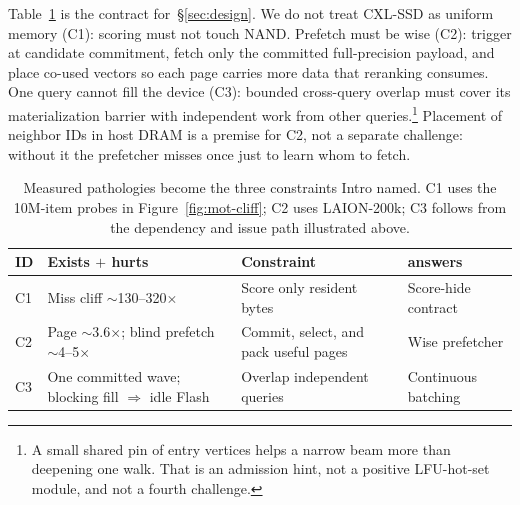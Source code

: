 Table~\ref{tab:findings} is the contract for~\S\ref{sec:design}.
We do not treat CXL-SSD as uniform memory (C1): scoring must not
touch NAND.
Prefetch must be wise (C2): trigger at candidate commitment, fetch only
the committed full-precision payload, and place co-used vectors so each
page carries more data that reranking consumes.
One query cannot fill the device (C3): bounded cross-query overlap must cover
its materialization barrier with independent work from other queries.\footnote{A small shared pin of entry vertices helps a narrow
beam more than deepening one walk. That is an admission hint, not a
positive LFU-hot-set module, and not a fourth challenge.}
Placement of neighbor IDs in host DRAM is a premise for C2, not a
separate challenge: without it the prefetcher misses once just to
learn whom to fetch.

\begin{table}[t]
  \caption{Measured pathologies become the three constraints
    Intro named. C1 uses the 10M-item probes in
    Figure~\ref{fig:mot-cliff}; C2 uses LAION-200k; C3 follows from the
    dependency and issue path illustrated above.}
  \label{tab:findings}
  \small
  \begin{tabular}{@{}p{}p{}p{}p{}@{}}
    \toprule
    ID & Exists $+$ hurts & Constraint & \sys{} answers \\
    \midrule
    C1 & Miss cliff $\sim$130--320$\times$ & Score only resident bytes & Score-hide contract \\
    C2 & Page $\sim$3.6$\times$; blind prefetch $\sim$4--5$\times$ & Commit, select, and pack useful pages & Wise prefetcher \\
    C3 & One committed wave; blocking fill $\Rightarrow$ idle Flash & Overlap independent queries & Continuous batching \\
    \bottomrule
  \end{tabular}
\end{table}
